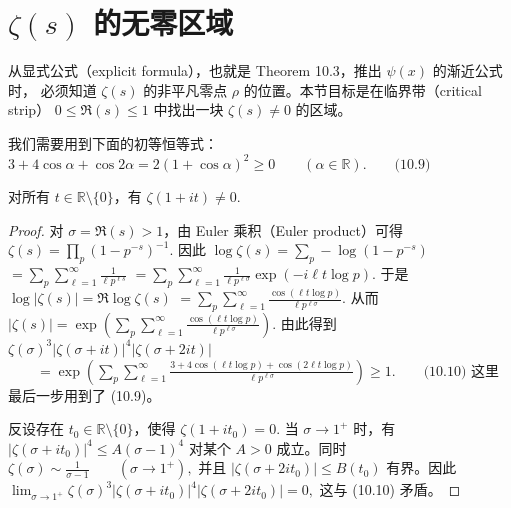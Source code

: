 \section{\texorpdfstring{\(\zeta(s)\) 的无零区域}{zeta(s) 的无零区域}}

从显式公式（explicit formula），也就是 Theorem 10.3，推出 $\psi(x)$ 的渐近公式时，
必须知道 $\zeta(s)$ 的非平凡零点 $\rho$ 的位置。本节目标是在临界带（critical strip）
\(\textstyle 0\leq\allowbreak{} \Re(s)\leq\allowbreak{} 1\)
中找出一块 $\zeta(s)\neq 0$ 的区域。

我们需要用到下面的初等恒等式：
\(\textstyle 3+\allowbreak{}4\cos\alpha+\allowbreak{}\cos 2\alpha =\allowbreak{} 2(1+\allowbreak{}\cos\alpha)^2 \geq\allowbreak{} 0 \qquad (\alpha\in\mathbb R). \qquad\text{(10.9)}\)

\begin{theorem}[原文 Theorem 10.4]
	对所有 $t\in\mathbb R\setminus\{0\}$，有
	\(\textstyle \zeta(1+\allowbreak{}it)\neq\allowbreak{} 0.\)
\end{theorem}

\begin{proof}
	对 $\sigma=\Re(s)>1$，由 Euler 乘积（Euler product）可得
	\(\textstyle \zeta(s) =\allowbreak{} \prod_p (1-p^{-s})^{-1}.\)
	因此
	\(\textstyle \log\zeta(s) =\allowbreak{} \sum_p -\log(1-p^{-s})\) \(\textstyle =\allowbreak{} \sum_p\sum_{\ell=\allowbreak{}1}^{\infty}\frac{1}{\ell p^{\ell s}}\) \(\textstyle =\allowbreak{} \sum_p\sum_{\ell=\allowbreak{}1}^{\infty} \frac{1}{\ell p^{\ell\sigma}} \exp(-i\ell t\log p).\)
	于是
	\(\textstyle \log|\zeta(s)| =\allowbreak{} \Re\log\zeta(s)\) \(\textstyle =\allowbreak{} \sum_p\sum_{\ell=\allowbreak{}1}^{\infty} \frac{\cos(\ell t\log p)}{\ell p^{\ell\sigma}}.\)
	从而
	\(\textstyle |\zeta(s)| =\allowbreak{} \exp\left( \sum_p\sum_{\ell=\allowbreak{}1}^{\infty} \frac{\cos(\ell t\log p)}{\ell p^{\ell\sigma}} \right).\)
	由此得到
	\(\textstyle \zeta(\sigma)^3 |\zeta(\sigma+\allowbreak{}it)|^4 |\zeta(\sigma+\allowbreak{}2it)|\) \(\textstyle \qquad=\allowbreak{} \exp\left( \sum_p\sum_{\ell=\allowbreak{}1}^{\infty} \frac{ 3+\allowbreak{}4\cos(\ell t\log p)+\allowbreak{}\cos(2\ell t\log p) }{\ell p^{\ell\sigma}} \right) \geq\allowbreak{} 1. \qquad\text{(10.10)}\)
	这里最后一步用到了 (10.9)。

	反设存在 $t_0\in\mathbb R\setminus\{0\}$，使得
	\(\textstyle \zeta(1+\allowbreak{}it_0)=\allowbreak{}0.\)
	当 $\sigma\to1^+$ 时，有
	\(\textstyle |\zeta(\sigma+\allowbreak{}it_0)|^4 \leq\allowbreak{} A(\sigma-1)^4\)
	对某个 $A>0$ 成立。同时
	\(\textstyle \zeta(\sigma)\sim\allowbreak{}\frac1{\sigma-1} \qquad(\sigma\to1^+\allowbreak{}),\allowbreak{}\)
	并且 $|\zeta(\sigma+2it_0)|\leq B(t_0)$ 有界。因此
	\(\textstyle \lim_{\sigma\to1^+\allowbreak{}} \zeta(\sigma)^3 |\zeta(\sigma+\allowbreak{}it_0)|^4 |\zeta(\sigma+\allowbreak{}2it_0)| =\allowbreak{} 0,\allowbreak{}\)
	这与 (10.10) 矛盾。
\end{proof}

